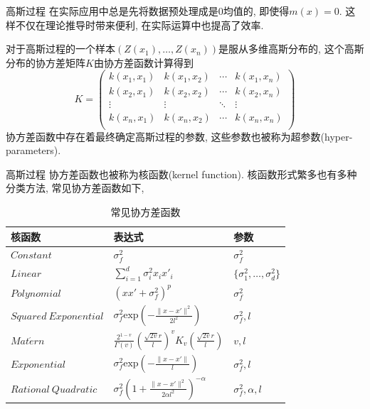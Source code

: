 \documentclass[10pt,mathserif]{beamer}
\theoremstyle{definition}
\numberwithin{equation}{section} %
\begin{document}
    \begin{frame}[fragile]{高斯过程}
        在实际应用中总是先将数据预处理成是$0$均值的, 即使得$m(x)=0$. 这样不仅在理论推导时带来便利, 在实际运算中也提高了效率. 

        对于高斯过程的一个样本$(Z(x_{1}),\dots,Z(x_{n}))$是服从多维高斯分布的, 这个高斯分布的协方差矩阵$K$由协方差函数计算得到
        \begin{equation}
            K= \begin{pmatrix}
                        k(x_{1},x_{1}) & k(x_{1},x_{2}) & \cdots & k(x_{1},x_{n}) \\
                        k(x_{2},x_{1}) & k(x_{2},x_{2}) & \cdots & k(x_{2},x_{n}) \\
                        \vdots         & \vdots         & \ddots & \vdots \\
                        k(x_{n},x_{1}) & k(x_{n},x_{2}) & \cdots & k(x_{n},x_{n}) \\
                    \end{pmatrix}
        \end{equation}
        协方差函数中存在着最终确定高斯过程的参数, 这些参数也被称为超参数(hyper-parameters).
    \end{frame}

    \begin{frame}[fragile]{高斯过程}
        协方差函数也被称为核函数(kernel function). 核函数形式繁多也有多种分类方法, 常见协方差函数如下,

            \begin{table}[h]
                \centering
                \caption{常见协方差函数}
                \begin{tabular}{lll}
                \hline
                \multicolumn{1}{l}{核函数}   & \multicolumn{1}{l}{表达式} & \multicolumn{1}{l}{参数} \\ \hline
                $Constant$                    &    $\sigma^{2}_{f}$      &   $\sigma^{2}_{f}$  \\
                $Linear$                      &  $\sum^{d}_{i=1}\sigma^{2}_{i}x_{i}x'_{i}$ & $\{\sigma^{2}_{1},\dots,\sigma^{2}_{d}\}$        \\
                $Polynomial$                  &  $(xx'+\sigma^{2}_{f})^{p}$ &     $\sigma^{2}_{f}$    \\
                $Squared\ Exponential$     & $\sigma^{2}_{f}\mathrm{exp}\left(-\frac{\|x-x'\|^{2}}{2l^{2}}\right)$ & $\sigma^{2}_{f},l$   \\
                $Mat\acute{e}rn$ &    $\frac{2^{1-v}}{\Gamma(v)} \left(\frac{\sqrt{2v}r}{l}\right)^{v}K_{v}\left(\frac{\sqrt{2v}r}{l}\right)$ &  $v,l$  \\
                $Exponential$  &   $\sigma^{2}_{f}\mathrm{exp}\left(-\frac{\|x-x'\|}{l}\right)$  &  $\sigma^{2}_{f},l$   \\
                $Rational\ Quadratic$ &   $\sigma^{2}_{f}\left(1+\frac{\|x-x'\|^{2}}{2\alpha l^{2}}\right)^{-\alpha}$  &  $\sigma^{2}_{f},\alpha,l$   \\ \hline
                \end{tabular}
            \end{table}
    \end{frame}
\end{document}
